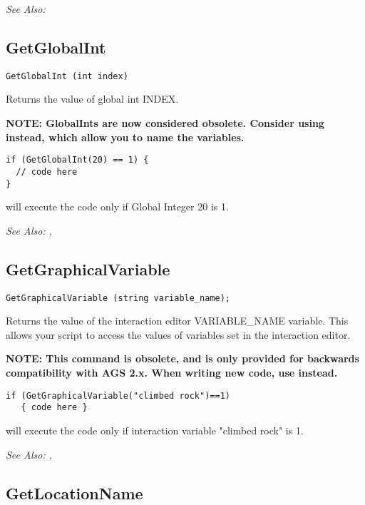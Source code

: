 \it{See Also:} 


\subsection{GetGlobalInt}\label{GetGlobalInt}%

\begin{verbatim}
GetGlobalInt (int index)
\end{verbatim}
Returns the value of global int INDEX.

\bf{NOTE:} GlobalInts are now considered obsolete. Consider using
 instead, which allow you to name
the variables.

\begin{verbatim}
if (GetGlobalInt(20) == 1) {
  // code here
}
\end{verbatim}
will execute the code only if Global Integer 20 is 1.

\it{See Also:} , 



\subsection{GetGraphicalVariable}\label{GetGraphicalVariable}%

\begin{verbatim}
GetGraphicalVariable (string variable_name);
\end{verbatim}
Returns the value of the interaction editor VARIABLE_NAME variable. This allows your
script to access the values of variables set in the interaction editor.

\bf{NOTE:} This command is obsolete, and is only provided for backwards compatibility
with AGS 2.x. When writing new code, use 
instead.

\begin{verbatim}
if (GetGraphicalVariable("climbed rock")==1)
   { code here }
\end{verbatim}
will execute the code only if interaction variable "climbed rock" is 1.

\it{See Also:} , 


\subsection{GetLocationName}\label{Game.GetLocationName}%

